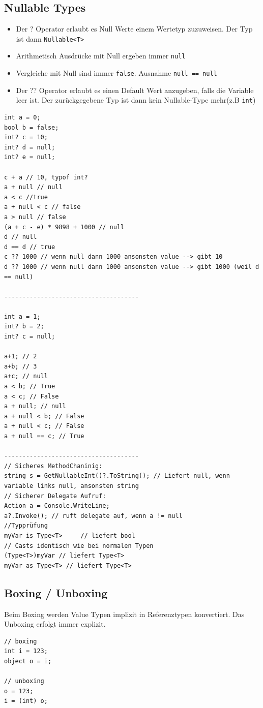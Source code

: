 \documentclass[
a4paper,
oneside,
10pt,
fleqn,
headsepline,
toc=listofnumbered, 
bibliography=totocnumbered]{scrartcl}
\begin{document}
\clearpage

\subsection{Nullable Types}
\begin{itemize}
	\item Der ? Operator erlaubt es Null Werte einem Wertetyp zuzuweisen. Der Typ ist dann \lstinline|Nullable<T>|
	\item Arithmetisch Ausdrücke mit Null ergeben immer \lstinline|null|
	\item Vergleiche mit Null sind immer \lstinline|false|. Ausnahme \lstinline|null == null|
	\item Der ?? Operator erlaubt es einen Default Wert anzugeben, falls die Variable leer ist. Der zurückgegebene Typ ist dann kein Nullable-Type mehr(z.B \lstinline|int|)
\end{itemize}
\begin{lstlisting}
int a = 0;
bool b = false;
int? c = 10;
int? d = null;
int? e = null;

c + a // 10, typof int?
a + null // null
a < c //true
a + null < c // false
a > null // false
(a + c - e) * 9898 + 1000 // null
d // null
d == d // true
c ?? 1000 // wenn null dann 1000 ansonsten value --> gibt 10 
d ?? 1000 // wenn null dann 1000 ansonsten value --> gibt 1000 (weil d == null)

-------------------------------------

int a = 1;
int? b = 2;
int? c = null;

a+1; // 2
a+b; // 3
a+c; // null
a < b; // True
a < c; // False
a + null; // null
a + null < b; // False
a + null < c; // False
a + null == c; // True

-------------------------------------
// Sicheres MethodChaninig:
string s = GetNullableInt()?.ToString(); // Liefert null, wenn variable links null, ansonsten string
// Sicherer Delegate Aufruf:
Action a = Console.WriteLine;
a?.Invoke(); // ruft delegate auf, wenn a != null
//Typprüfung
myVar is Type<T>     // liefert bool 
// Casts identisch wie bei normalen Typen
(Type<T>)myVar // liefert Type<T> 
myVar as Type<T> // liefert Type<T> 
\end{lstlisting}

\clearpage

\subsection{Boxing / Unboxing}
Beim Boxing werden Value Typen implizit in Referenztypen konvertiert. Das Unboxing erfolgt immer explizit. 
\begin{lstlisting}
// boxing
int i = 123;
object o = i;

// unboxing
o = 123;
i = (int) o;
\end{lstlisting}
\end{document}
